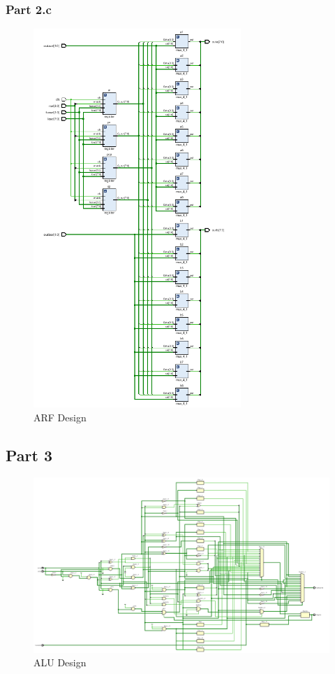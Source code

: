 \documentclass[pdftex,12pt,a4paper]{article}
\begin{document}
\subsubsection{Part 2.c}
\begin{figure}[H]
	\centering
	\includegraphics[width=0.7\textwidth]{design/arf.png}	
	\caption{ARF Design}
	\label{ARF Design}
\end{figure}

\subsection{Part 3}
\begin{figure}[H]
	\centering
	\includegraphics[width=1.1\textwidth]{design/alu.png}	
	\caption{ALU Design}
	\label{ALU Design}
\end{figure}
\end{document}
